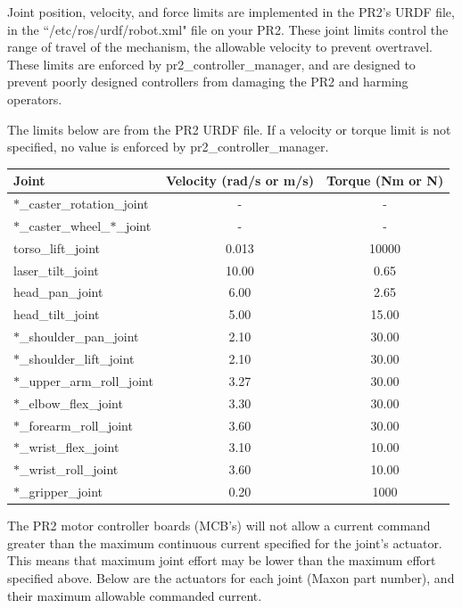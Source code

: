 Joint position, velocity, and force limits are implemented in the PR2's URDF file, in the ``/etc/ros/urdf/robot.xml" file on your PR2. These joint limits control the range of travel of the mechanism, the allowable velocity to prevent overtravel. These limits are enforced by pr2\_controller\_manager, and are designed to prevent poorly designed controllers from damaging the PR2 and harming operators. 



The limits below are from the PR2 URDF file. If a velocity or torque limit is not specified, no value is enforced by pr2\_controller\_manager.

\begin{tabular}{l*{2}{c}}
Joint  & Velocity (rad/s or m/s) & Torque (Nm or N) \\
\hline \hline
$\ast$\_caster\_rotation\_joint        & -     & -  \\
$\ast$\_caster\_wheel\_$\ast$\_joint   & -     & -  \\
torso\_lift\_joint                     & 0.013 & 10000 \\
laser\_tilt\_joint                     & 10.00 & 0.65  \\
head\_pan\_joint                       & 6.00  & 2.65  \\
head\_tilt\_joint                      & 5.00  & 15.00 \\
$\ast$\_shoulder\_pan\_joint           & 2.10  & 30.00 \\
$\ast$\_shoulder\_lift\_joint          & 2.10  & 30.00 \\
$\ast$\_upper\_arm\_roll\_joint        & 3.27  & 30.00 \\
$\ast$\_elbow\_flex\_joint             & 3.30  & 30.00 \\
$\ast$\_forearm\_roll\_joint           & 3.60  & 30.00 \\
$\ast$\_wrist\_flex\_joint             & 3.10  & 10.00 \\
$\ast$\_wrist\_roll\_joint             & 3.60  & 10.00 \\
$\ast$\_gripper\_joint                 & 0.20  & 1000  \\
\end{tabular}

The PR2 motor controller boards (MCB's) will not allow a current command greater than the maximum continuous current specified for the joint's actuator. This means that maximum joint effort may be lower than the maximum effort specified above. Below are the actuators for each joint (Maxon part number), and their maximum allowable commanded current. 

